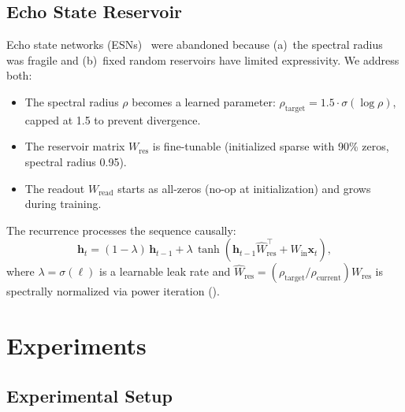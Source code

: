 \documentclass[11pt,a4paper]{article}
\begin{document}
\subsection{Echo State Reservoir}
\label{sec:esn}

Echo state networks (ESNs)~\citep{jaeger2001echo} were abandoned
because (a)~the spectral radius was fragile and (b)~fixed random
reservoirs have limited expressivity.  We address both:

\begin{itemize}[leftmargin=*,nosep]
\item The spectral radius $\rho$ becomes a learned parameter:
  $\rho_{\text{target}} = 1.5 \cdot \sigma(\log\rho)$, capped at
  1.5 to prevent divergence.
\item The reservoir matrix $W_{\text{res}}$ is fine-tunable
  (initialized sparse with 90\% zeros, spectral radius 0.95).
\item The readout $W_{\text{read}}$ starts as all-zeros (no-op at
  initialization) and grows during training.
\end{itemize}

The recurrence processes the sequence causally:
\begin{equation}
\bm{h}_t = (1 - \lambda)\,\bm{h}_{t-1} + \lambda\,
  \tanh\!\left(\bm{h}_{t-1} \hat{W}_{\text{res}}^\top +
  W_{\text{in}} \bm{x}_t\right),
\end{equation}
where $\lambda = \sigma(\ell)$ is a learnable leak rate and
$\hat{W}_{\text{res}} = (\rho_{\text{target}} /
\rho_{\text{current}}) W_{\text{res}}$ is spectrally normalized
via power iteration ().


\section{Experiments}
\label{sec:experiments}

\subsection{Experimental Setup}
\label{sec:setup}
\end{document}
